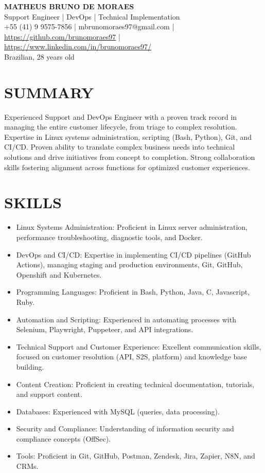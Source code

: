 \documentclass[10pt, letterpaper]{article}
\newenvironment{header}{
    \setlength{\topsep}{0pt}\par\kern\topsep\centering\linespread{1.5}
}{\par\kern\topsep}
\begin{document}
\begin{header}
\textbf{MATHEUS BRUNO DE MORAES} \\
Support Engineer | DevOps | Technical Implementation \\
+55 (41) 9 9575-7856 | mbrunomoraes97@gmail.com | \href{https://github.com/brunomoraes97}{https://github.com/brunomoraes97} | \href{https://www.linkedin.com/in/brunomoraes97/}{https://www.linkedin.com/in/brunomoraes97/} \\
Brazilian, 28 years old
\end{header}

\section*{SUMMARY}
Experienced Support and DevOps Engineer with a proven track record in managing the entire customer lifecycle, from triage to complex resolution. Expertise in Linux systems administration, scripting (Bash, Python), Git, and CI/CD.  Proven ability to translate complex business needs into technical solutions and drive initiatives from concept to completion.  Strong collaboration skills fostering alignment across functions for optimized customer experiences.

\section*{SKILLS}
\begin{itemize}
\item Linux Systems Administration:  Proficient in Linux server administration, performance troubleshooting, diagnostic tools, and Docker.
\item DevOps and CI/CD: Expertise in implementing CI/CD pipelines (GitHub Actions), managing staging and production environments, Git, GitHub, Openshift and Kubernetes.
\item Programming Languages:  Proficient in Bash, Python, Java, C, Javascript, Ruby.
\item Automation and Scripting: Experienced in automating processes with Selenium, Playwright, Puppeteer, and API integrations.
\item Technical Support and Customer Experience:  Excellent communication skills, focused on customer resolution (API, S2S, platform) and knowledge base building.
\item Content Creation:  Proficient in creating technical documentation, tutorials, and support content.
\item Databases:  Experienced with MySQL (queries, data processing).
\item Security and Compliance:  Understanding of information security and compliance concepts (OffSec).
\item Tools:  Proficient in Git, GitHub, Postman, Zendesk, Jira, Zapier, N8N, and CRMs.
\end{itemize}
\end{document}
